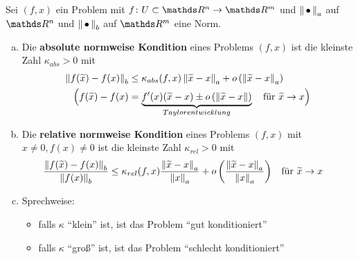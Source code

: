 


\begin{Defe}\label{3.2.7}
  Sei $(f,x)$ ein Problem mit $f\colon U\subset \R^n \to \R^m$
  und $\nn_a$ auf $\R^n$ und $\nn_b$ auf $\R^m$ eine Norm.
  \begin{enumerate}[a)]
  \item Die \textbf{absolute normweise
      Kondition} 
    eines Problems $(f,x)$ ist die kleinste Zahl 
    $\kappa _{abs} > 0 $ mit
    \begin{align}
      \nn[f(\widetilde{x})-f(x)]_b 
      &\leq \kappa_{abs}(f,x) \nn[\widetilde{x}-x]_a
        + o\left(\nn[\widetilde{x}-x]_a\right) 
        \label{III.2.2} \\\nonumber
      \Bigl(f(\widetilde{x})- f(x) 
      &=\underbrace{f'(x)(\widetilde{x}-x)
        \pm o\left(\nn[\widetilde{x}-x]\right)}_{Taylorentwicklung}
        \quad \text{für }\widetilde{x}\to x \Bigr)
    \end{align}
  \item Die \textbf{relative normweise
      Kondition} 
    eines Problems $(f,x)$  mit $x\neq 0, f(x) \neq 0$
    ist die kleinste Zahl 
    $\kappa _{rel} > 0 $ mit
    \begin{align}
      \frac{\nn[f(\widetilde{x})-f(x)]_b}{\nn[f(x)]_b}
      &\leq \kappa _{rel}(f,x)\frac{\nn[\widetilde{x}-x]_a}{\nn[x]_a}
        + o\left(\frac{\nn[\widetilde{x}-x]_a}{\nn[x]_a}\right) \label{III.2.3}
      &&	\text{für } \widetilde{x} \to x
    \end{align}
  \item Sprechweise:
    \begin{itemize}
    \item falls $\kappa$ \enquote{klein} ist,
      ist das Problem \enquote{gut konditioniert}
    \item falls $\kappa$ \enquote{groß} ist, 
      ist das Problem \enquote{schlecht konditioniert}
    \end{itemize}
  \end{enumerate}
\end{Defe}

